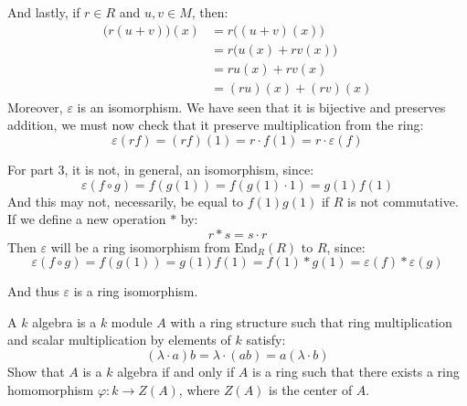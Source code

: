 \documentclass[crop=false,class=article]{standalone}                       %
\begin{document}
\begin{solution}
            And lastly, if $r\in{R}$ and $u,v\in{M}$, then:
            \begin{subequations}
                \begin{align}
                    \big(r(u+v)\big)(x)
                    &=r\big((u+v)(x)\big)\\
                    &=r\big(u(x)+rv(x)\big)\\
                    &=ru(x)+rv(x)\\
                    &=(ru)(x)+(rv)(x)
                \end{align}
            \end{subequations}
            Moreover, $\varepsilon$ is an isomorphism. We have seen that
            it is bijective and preserves addition, we must now check
            that it preserve multiplication from the ring:
            \begin{equation}
                \varepsilon(rf)
                =(rf)(1)
                =r\cdot{f}(1)
                =r\cdot\varepsilon(f)
            \end{equation}
            \par\hfill\par
            For part 3, it is not, in general, an isomorphism, since:
            \begin{equation}
                \varepsilon(f\circ{g})
                =f(g(1))
                =f(g(1)\cdot{1})
                =g(1)f(1)
            \end{equation}
            And this may not, necessarily, be equal to $f(1)g(1)$ if
            $R$ is not commutative. If we define a new operation
            $*$ by:
            \begin{equation}
                r*s=s\cdot{r}
            \end{equation}
            Then $\varepsilon$ will be a ring isomorphism from
            $\textrm{End}_{R}(R)$ to $R$, since:
            \begin{equation}
                \varepsilon(f\circ{g})=
                f(g(1))=g(1)f(1)=f(1)*g(1)
                =\varepsilon(f)*\varepsilon(g)
            \end{equation}
        \end{solution}
        And thus $\varepsilon$ is a ring isomorphism.
    \begin{problem}
        A $k$ algebra is a $k$ module $A$ with a ring structure such
        that ring multiplication and scalar multiplication by elements
        of $k$ satisfy:
        \begin{equation}
            (\lambda\cdot{a})b=\lambda\cdot(ab)=a(\lambda\cdot{b})
        \end{equation}
        Show that $A$ is a $k$ algebra if and only if $A$ is a ring such
        that there exists a ring homomorphism $\varphi:k\rightarrow{Z}(A)$,
        where $Z(A)$ is the center of $A$.
    \end{problem}
\end{document}
